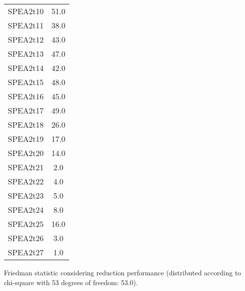 \documentclass{article}
\begin{document}
\begin{table}[!htp]
\begin{tabular}{c|c}
SPEA2t10&51.0\\
SPEA2t11&38.0\\
SPEA2t12&43.0\\
SPEA2t13&47.0\\
SPEA2t14&42.0\\
SPEA2t15&48.0\\
SPEA2t16&45.0\\
SPEA2t17&49.0\\
SPEA2t18&26.0\\
SPEA2t19&17.0\\
SPEA2t20&14.0\\
SPEA2t21&2.0\\
SPEA2t22&4.0\\
SPEA2t23&5.0\\
SPEA2t24&8.0\\
SPEA2t25&16.0\\
SPEA2t26&3.0\\
SPEA2t27&1.0\\
\end{tabular}
\end{table}


Friedman statistic considering reduction performance (distributed according to chi-square with 53 degrees of freedom: 53.0).
\end{document}
